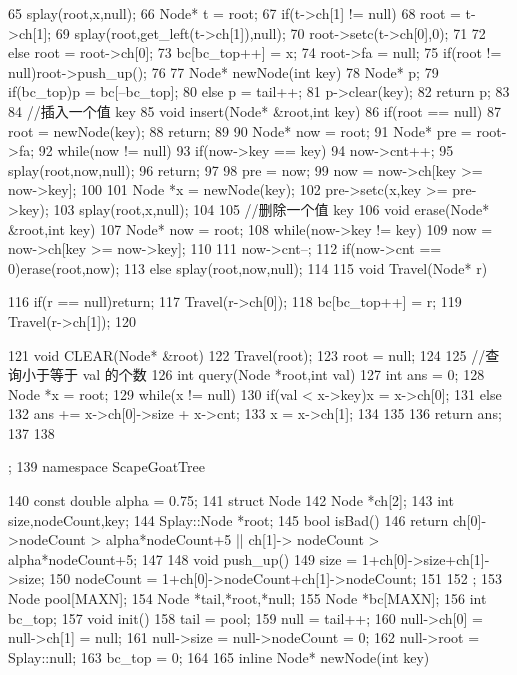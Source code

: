 \documentclass[11pt]{article}
\begin{document}
\begin{Code}
{{ 65              splay(root,x,null);
 66              Node* t = root;
 67              if(t->ch[1] != null){
 68                  root = t->ch[1];
 69                  splay(root,get_left(t->ch[1]),null);
 70                  root->setc(t->ch[0],0);
 71              }
 72              else root = root->ch[0];
 73              bc[bc_top++] = x;
 74              root->fa = null;
 75              if(root != null)root->push_up();
 76       }
 77       Node* newNode(int key){
 78           Node* p;
 79           if(bc_top)p = bc[--bc_top];
 80           else p = tail++;
 81           p->clear(key);
 82           return p;
 83       }
 84       //插入一个值 key
 85       void insert(Node* &root,int key){
 86           if(root == null){
 87               root = newNode(key);
 88               return;
 89           }
 90           Node* now = root;
 91           Node* pre = root->fa;
 92           while(now != null){
 93               if(now->key == key){
 94                    now->cnt++;
 95                    splay(root,now,null);
 96                    return;
 97               }
 98               pre = now;
 99               now = now->ch[key >= now->key];
100           }
101           Node *x = newNode(key);
102           pre->setc(x,key >= pre->key);
103           splay(root,x,null);
104       }
105       //删除一个值 key
106       void erase(Node* &root,int key){
107           Node* now = root;
108           while(now->key != key){
109               now = now->ch[key >= now->key];
110           }
111           now->cnt--;
112           if(now->cnt == 0)erase(root,now);
113           else splay(root,now,null);
114       }
115       void Travel(Node* r){


116         if(r == null)return;
117         Travel(r->ch[0]);
118         bc[bc_top++] = r;
119         Travel(r->ch[1]);
120     }
121     void CLEAR(Node* &root){
122         Travel(root);
123         root = null;
124     }
125     //查询小于等于 val 的个数
126     int query(Node *root,int val){
127         int ans = 0;
128         Node *x = root;
129         while(x != null){
130             if(val < x->key)x = x->ch[0];
131             else{
132                  ans += x->ch[0]->size + x->cnt;
133                  x = x->ch[1];
134             }
135         }
136         return ans;
137     }
138 };
139 namespace ScapeGoatTree{
140     const double alpha = 0.75;
141     struct Node{
142         Node *ch[2];
143         int size,nodeCount,key;
144         Splay::Node *root;
145         bool isBad(){
146             return ch[0]->nodeCount > alpha*nodeCount+5 || ch[1]->
                   nodeCount > alpha*nodeCount+5;
147         }
148         void push_up(){
149             size = 1+ch[0]->size+ch[1]->size;
150             nodeCount = 1+ch[0]->nodeCount+ch[1]->nodeCount;
151         }
152     };
153     Node pool[MAXN];
154     Node *tail,*root,*null;
155     Node *bc[MAXN];
156     int bc_top;
157     void init(){
158         tail = pool;
159         null = tail++;
160         null->ch[0] = null->ch[1] = null;
161         null->size = null->nodeCount = 0;
162         null->root = Splay::null;
163         bc_top = 0;
164     }
165     inline Node* newNode(int key){


}}
\end{Code}
\end{document}

